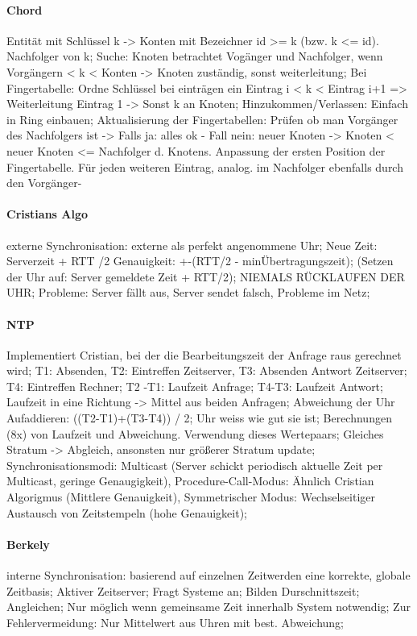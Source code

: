 \documentclass[pagesize,11pt,a4paper]{scrartcl}
\begin{document}
\paragraph*{Chord}
	Entität mit Schlüssel k -> Konten mit Bezeichner id >= k (bzw. k <= id). Nachfolger von k;
	Suche: Knoten betrachtet Vogänger und Nachfolger, wenn Vorgängern < k < Konten -> Knoten zuständig, sonst weiterleitung;
	Bei Fingertabelle: Ordne Schlüssel bei einträgen ein Eintrag i < k < Eintrag i+1 => Weiterleitung Eintrag 1 -> Sonst k an Knoten;
	Hinzukommen/Verlassen: Einfach in Ring einbauen; Aktualisierung der Fingertabellen: Prüfen ob man Vorgänger des Nachfolgers ist ->
		Falls ja: alles ok -
		Fall nein: neuer Knoten -> Knoten < neuer Knoten <= Nachfolger d. Knotens. Anpassung der ersten Position der Fingertabelle. Für jeden weiteren Eintrag, analog. im Nachfolger ebenfalls durch den Vorgänger-

\paragraph*{Cristians Algo}
	externe Synchronisation: externe als perfekt angenommene Uhr;
	Neue Zeit: Serverzeit + RTT /2  Genauigkeit: +-(RTT/2 - minÜbertragungszeit);
	(Setzen der Uhr auf: Server gemeldete Zeit + RTT/2);
	NIEMALS RÜCKLAUFEN DER UHR;
	Probleme: Server fällt aus, Server sendet falsch, Probleme im Netz;

\paragraph*{NTP}
	Implementiert Cristian, bei der die Bearbeitungszeit der Anfrage raus gerechnet wird;
	T1: Absenden, T2: Eintreffen Zeitserver, T3: Absenden Antwort Zeitserver; T4: Eintreffen Rechner;
	T2 -T1: Laufzeit Anfrage; T4-T3: Laufzeit Antwort;
	Laufzeit in eine Richtung -> Mittel aus beiden Anfragen;
	Abweichung der Uhr Aufaddieren: ((T2-T1)+(T3-T4)) / 2;
	Uhr weiss wie gut sie ist;
	Berechnungen (8x) von Laufzeit und Abweichung. Verwendung dieses Wertepaars;
	Gleiches Stratum -> Abgleich, ansonsten nur größerer Stratum update;
	Synchronisationsmodi: Multicast (Server schickt periodisch aktuelle Zeit per Multicast, geringe Genaugigkeit), Procedure-Call-Modus: Ähnlich Cristian Algorigmus (Mittlere Genauigkeit), Symmetrischer Modus: Wechselseitiger Austausch von Zeitstempeln (hohe Genauigkeit); 

\paragraph*{Berkely}
	interne Synchronisation: basierend auf einzelnen Zeitwerden eine korrekte, globale Zeitbasis;
	Aktiver Zeitserver; Fragt Systeme an; Bilden Durschnittszeit; Angleichen;
	Nur möglich wenn gemeinsame Zeit innerhalb System notwendig;
	Zur Fehlervermeidung: Nur Mittelwert aus Uhren mit best. Abweichung;
\end{document}
